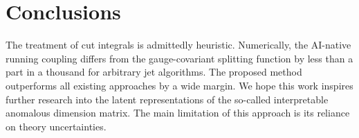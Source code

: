 \section{Conclusions}\label{sec:conclusions}

The treatment of cut integrals is admittedly heuristic. Numerically, the
AI-native running coupling differs from the gauge-covariant splitting
function by less than a part in a thousand for arbitrary jet algorithms.
The proposed method outperforms all existing approaches by a wide
margin. We hope this work inspires further research into the latent
representations of the so-called interpretable anomalous dimension
matrix. The main limitation of this approach is its reliance on theory
uncertainties.

